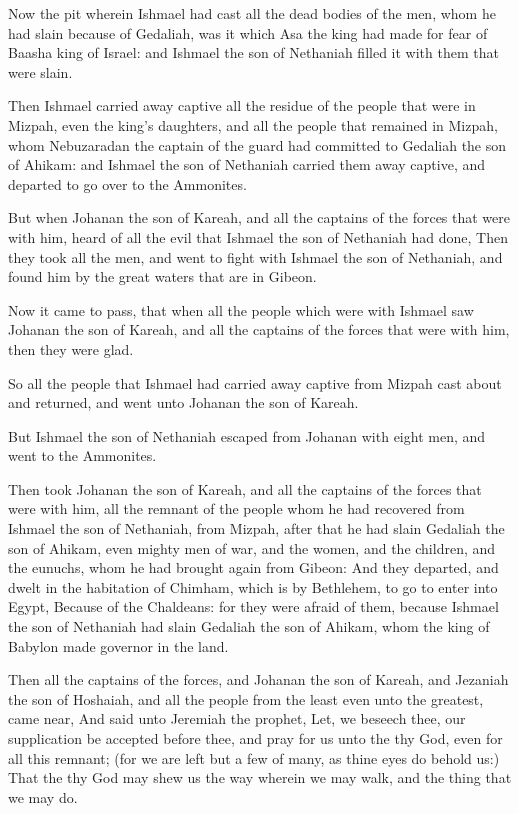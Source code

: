 \Verse Now the pit wherein Ishmael had cast all the dead bodies of the men, whom he had slain because of Gedaliah, was it which Asa the king had made for fear of Baasha king of Israel: and Ishmael the son of Nethaniah filled it with them that were slain.

\Verse Then Ishmael carried away captive all the residue of the people that were in Mizpah, even the king's daughters, and all the people that remained in Mizpah, whom Nebuzaradan the captain of the guard had committed to Gedaliah the son of Ahikam: and Ishmael the son of Nethaniah carried them away captive, and departed to go over to the Ammonites.

\Verse But when Johanan the son of Kareah, and all the captains of the forces that were with him, heard of all the evil that Ishmael the son of Nethaniah had done, \Verse Then they took all the men, and went to fight with Ishmael the son of Nethaniah, and found him by the great waters that are in Gibeon.

\Verse Now it came to pass, that when all the people which were with Ishmael saw Johanan the son of Kareah, and all the captains of the forces that were with him, then they were glad.

\Verse So all the people that Ishmael had carried away captive from Mizpah cast about and returned, and went unto Johanan the son of Kareah.

\Verse But Ishmael the son of Nethaniah escaped from Johanan with eight men, and went to the Ammonites.

\Verse Then took Johanan the son of Kareah, and all the captains of the forces that were with him, all the remnant of the people whom he had recovered from Ishmael the son of Nethaniah, from Mizpah, after that he had slain Gedaliah the son of Ahikam, even mighty men of war, and the women, and the children, and the eunuchs, whom he had brought again from Gibeon: \Verse And they departed, and dwelt in the habitation of Chimham, which is by Bethlehem, to go to enter into Egypt, \Verse Because of the Chaldeans: for they were afraid of them, because Ishmael the son of Nethaniah had slain Gedaliah the son of Ahikam, whom the king of Babylon made governor in the land.


\Chapter
\Verse Then all the captains of the forces, and Johanan the son of Kareah, and Jezaniah the son of Hoshaiah, and all the people from the least even unto the greatest, came near, \Verse And said unto Jeremiah the prophet, Let, we beseech thee, our supplication be accepted before thee, and pray for us unto the \LORD thy God, even for all this remnant; (for we are left but a few of many, as thine eyes do behold us:) \Verse That the \LORD thy God may shew us the way wherein we may walk, and the thing that we may do.

